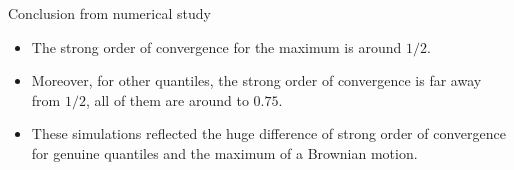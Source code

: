 \documentclass[cjk,10pt]{beamer}
\begin{document}
%
% 

\begin{frame}{Conclusion from numerical study}
\begin{itemize}
\item
The strong order of convergence for the maximum is around $1/2$.
\item
Moreover, for other quantiles, the strong order of convergence is far away from $1/2$, all of them are around to $0.75$.
\item
These simulations reflected the huge difference of strong order of convergence for genuine quantiles and the maximum of a Brownian motion.
\end{itemize}
\end{frame}
\end{document}
